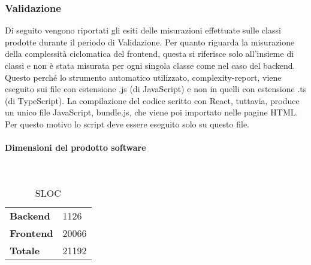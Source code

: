 \subsubsection{Validazione}
Di seguito vengono riportati gli esiti delle misurazioni effettuate sulle classi prodotte durante il periodo di Validazione.
Per quanto riguarda la misurazione della complessità ciclomatica del frontend, questa si riferisce solo all'insieme di classi e non è stata misurata per ogni singola classe come nel caso del backend. Questo perché lo strumento automatico utilizzato, complexity-report, viene eseguito sui file con estensione .js (di JavaScript) e non in quelli con estensione .ts (di TypeScript). La compilazione del codice scritto con React, tuttavia, produce un unico file JavaScript, bundle.js, che viene poi importato nelle pagine HTML. Per questo motivo lo script deve essere eseguito solo su questo file.

\paragraph{Dimensioni del prodotto software} \mbox{} \\
\begin{table}[H]
\centering
\begin{tabular}{|l|l|}
\cline{1-2}
\textbf{Backend} & 1126 \\ \cline{1-2} 
\textbf{Frontend} & 20066 \\ \cline{1-2} 
\textbf{Totale} & 21192 \\ \cline{1-2}
\end{tabular}
\caption{SLOC}
\end{table}

